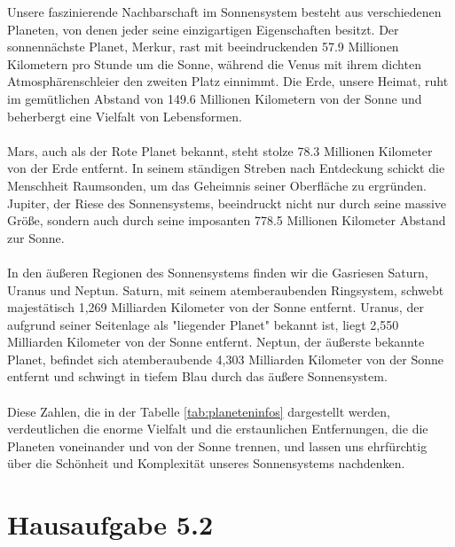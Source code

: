 \documentclass{scrartcl}
\begin{document}
Unsere faszinierende Nachbarschaft im Sonnensystem besteht aus verschiedenen Planeten, von denen jeder seine einzigartigen Eigenschaften besitzt. Der sonnennächste Planet, Merkur, rast mit beeindruckenden 57.9 Millionen Kilometern pro Stunde um die Sonne, während die Venus mit ihrem dichten Atmosphärenschleier den zweiten Platz einnimmt. Die Erde, unsere Heimat, ruht im gemütlichen Abstand von 149.6 Millionen Kilometern von der Sonne und beherbergt eine Vielfalt von Lebensformen. \\
\\
Mars, auch als der Rote Planet bekannt, steht stolze 78.3 Millionen Kilometer von der Erde entfernt. In seinem ständigen Streben nach Entdeckung schickt die Menschheit Raumsonden, um das Geheimnis seiner Oberfläche zu ergründen. Jupiter, der Riese des Sonnensystems, beeindruckt nicht nur durch seine massive Größe, sondern auch durch seine imposanten 778.5 Millionen Kilometer Abstand zur Sonne.\\
\\
In den äußeren Regionen des Sonnensystems finden wir die Gasriesen Saturn, Uranus und Neptun. Saturn, mit seinem atemberaubenden Ringsystem, schwebt majestätisch 1,269 Milliarden Kilometer von der Sonne entfernt. Uranus, der aufgrund seiner Seitenlage als "liegender Planet" bekannt ist, liegt 2,550 Milliarden Kilometer von der Sonne entfernt. Neptun, der äußerste bekannte Planet, befindet sich atemberaubende 4,303 Milliarden Kilometer von der Sonne entfernt und schwingt in tiefem Blau durch das äußere Sonnensystem. \\
\\
Diese Zahlen, die in der Tabelle \ref{tab:planeteninfos} dargestellt werden, verdeutlichen die enorme Vielfalt und die erstaunlichen Entfernungen, die die Planeten voneinander und von der Sonne trennen, und lassen uns ehrfürchtig über die Schönheit und Komplexität unseres Sonnensystems nachdenken.

\newpage
\section{Hausaufgabe 5.2}
\end{document}
